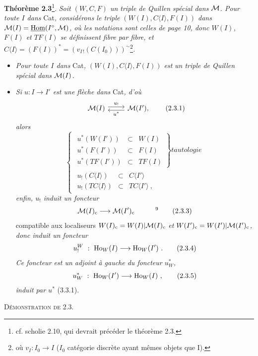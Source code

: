 \textbf{Théorème 2.3}\footnote[7]{cf. scholie 2.10, qui devrait précéder le théorème 2.3.}. \textit{Soit $(W,C,F)$ un triple de Quillen spécial dans $\mathcal{M}$. Pour toute $I$ dans} Cat\textit{, considérons le triple $(W(I),C\langle I\rangle,F(I))$ dans $\mathcal{M}(I) = \underline{\mathrm{Hom}}(I^{\circ},\mathcal{M})$, où les notations sont celles de page 10, donc $W(I)$, $F(I)$ et $TF(I)$ se définissent fibre par fibre, et $C\langle I\rangle = (F(I))^* = (v_{I\,!}(C(I_0)))^{\sim}$}\footnote[8]{où $v_I : I_0 \longrightarrow I$ ($I_0$ catégorie discrète ayant mêmes objets que I).}\textit{.}
\begin{itemize}
\item[1°)] \textit{Pour toute $I$ dans} Cat\textit{, $(W(I),C\langle I\rangle,F(I))$ est}
\textit{un triple de Quillen spécial dans $\mathcal{M}(I)$.}
\item[2°)] \textit{Si $u : I \longrightarrow I'$ est une flèche dans} Cat\textit{, d'où}
\[
\begin{tikzcd}
\M(I) \arrow[r, shift left, "u_!"] & \M(I'), \arrow[l, shift left, "u^*"]
\end{tikzcd}
\tag*{(2.3.1)}
\]
\textit{alors}
\[
\left\{
\begin{array}{l}
\left.\begin{array}{rcl}
u^*(W(I')) & \subset & W(I)\\
u^*(F(I')) & \subset & F(I)\\
u^*(TF(I')) & \subset & TF(I)
\end{array}\right\}\textit{tautologie}\\
\begin{array}{rcl}
u_!(C\langle I\rangle) & \subset & C\langle I'\rangle\\
u_!(TC\langle I\rangle) & \subset & TC\langle I'\rangle\ ,
\end{array}
\end{array}\right.
\tag*{(2.3.2)}
\]
\textit{enfin, $u_!$ induit un foncteur}
\[
\M(I)_{\cc} \longrightarrow \M(I')_{\cc} \qquad\quad \text{\footnotemark[9]}
\tag*{(2.3.3)}
\]
compatible aux localiseurs $W(I)_{\mathrm{c}} = W(I)|\mathcal{M}(I)_{\mathrm{c}}$ \textit{et} $W(I')_{\mathrm{c}} = W(I')|\mathcal{M}(I')_{\mathrm{c}}$\textit{, donc induit un foncteur}
\[
u_!^W\ :\ \Ho_W(I) \longrightarrow \Ho_W(I')\ .
\tag*{(2.3.4)}
\]
\textit{Ce foncteur est un adjoint à gauche du foncteur $u^*_W$,}
\[
u^*_W\ :\ \Ho_W(I') \longrightarrow \Ho_W(I)\ ,
\tag*{(2.3.5)}
\]
\textit{induit par $u^*$} (3.3.1). %
\end{itemize}
\textsc{Démonstration de 2.3.}

